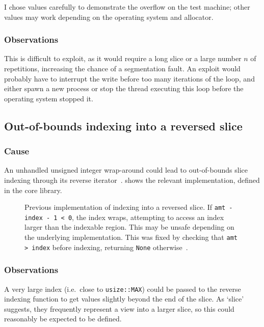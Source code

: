 \documentclass[dissertation.tex]{subfiles}
\begin{document}
I chose values carefully to demonstrate the overflow on the test
machine; other values may work depending on the operating system and
allocator.

\subsubsection{Observations}
This is difficult to exploit, as it would require a long slice or a
large number \(n\) of repetitions, increasing the chance of a
segmentation fault.
An exploit would probably have to interrupt the write before too many
iterations of the loop, and either spawn a new process or stop the
thread executing this loop before the operating system stopped it.


\subsection{Out-of-bounds indexing into a reversed slice}

\subsubsection{Cause}
An unhandled unsigned integer wrap-around could lead to out-of-bounds
slice indexing through its reverse iterator~\cite{rust-pr-reverse}.
 shows the relevant implementation, defined in the
core library.

\begin{figure}[ht]
    
    \caption{
        Previous implementation of indexing into a reversed slice.
        If \texttt{amt - index - 1 < 0}, the index wraps, attempting to
        access an index larger than the indexable region.
        This may be unsafe depending on the underlying implementation.
        This was fixed by checking that \texttt{amt > index} before
        indexing, returning \texttt{None}
        otherwise~\cite{rust-commit-reverse}.
    }
    \label{lst:bug-reverse}
\end{figure}

\subsubsection{Observations}
A very large index (i.e.\ close to \texttt{usize::MAX}) could be passed
to the reverse indexing function to get values slightly beyond the end
of the slice.
As `slice' suggests, they frequently represent a view into a larger
slice, so this could reasonably be expected to be defined.
\end{document}

